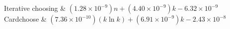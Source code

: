 Iterative choosing & \((1.28 \times 10^{-9})n + (4.40 \times 10^{-9})k - 6.32 \times 10^{-9}\)\\
Cardchoose & \((7.36 \times 10^{-10})(k \ln k) + (6.91 \times 10^{-9})k - 2.43 \times 10^{-8}\)\\
